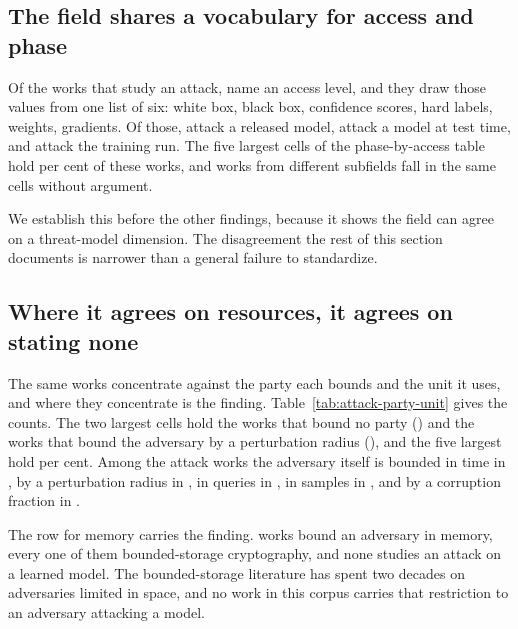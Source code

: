 \subsection{The field shares a vocabulary for access and phase}

Of the \NumAttackWorks{} works that study an attack, \AttackAccessNamed{} name
an access level, and they draw those values from one list of six: white box,
black box, confidence scores, hard labels, weights, gradients. Of those,
\AttackPostHoc{} attack a released model, \AttackTestTime{} attack a model at
test time, and \AttackTrainTime{} attack the training run. The five largest
cells of the phase-by-access table hold \PhaseAccessTopFive{} per cent of
these works, and works from different subfields fall in the same cells without
argument.

We establish this before the other findings, because it shows the field can
agree on a threat-model dimension. The disagreement the rest of this section
documents is narrower than a general failure to standardize.

\subsection{Where it agrees on resources, it agrees on stating none}

The same works concentrate against the party each bounds and the unit it uses,
and where they concentrate is the finding. Table~\ref{tab:attack-party-unit}
gives the counts. The two largest cells hold the works that bound no party
(\AttackUnbound{}) and the works that bound the adversary by a perturbation
radius (\AttackPerturb{}), and the five largest hold
\PartyUnitTopFive{} per cent. Among the \NumAttackWorks{} attack works the
adversary itself is bounded in time in \AttackTimeAttacker{}, by a
perturbation radius in \AttackPerturb{}, in queries in
\AttackQueriesAttacker{}, in samples in
\AttackSamplesAttacker{}, and by a corruption fraction in \AttackCorrupt{}.



The row for memory carries the finding. \AttackerMemory{} works bound an
adversary in memory, every one of them bounded-storage cryptography, and none
studies an attack on a learned model. The bounded-storage literature has spent
two decades on adversaries limited in space, and no work in this corpus
carries that restriction to an adversary attacking a model.

